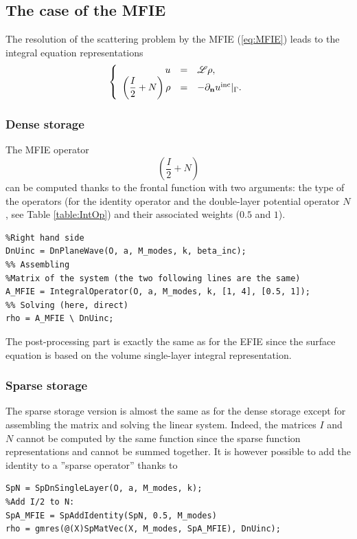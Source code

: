 \subsection{The case of the MFIE}


The resolution of the scattering problem by the MFIE (\ref{eq:MFIE}) leads to the integral equation representations
$$
\left\{\begin{array}{r c l}
u &=& {\mathscr L}\rho,\\
\displaystyle \left(\frac{I}{2}+N\right)\rho &=& -\partial_{\mathbf{n}}u^{\textrm{inc}}|_{\Gamma}.
\end{array}\right.
$$

\subsubsection{Dense storage}

The MFIE operator $$\left(\frac{I}{2}+N\right)$$ can be computed  thanks to the frontal function \IntegralOperator with two
 arguments: the type of the operators (for the identity operator and the double-layer potential operator $N$, see
  Table \ref{table:IntOp}) and their associated weights ($0.5$ and $1$). 
\begin{lstlisting}
%Right hand side
DnUinc = DnPlaneWave(O, a, M_modes, k, beta_inc);
%% Assembling
%Matrix of the system (the two following lines are the same)
A_MFIE = IntegralOperator(O, a, M_modes, k, [1, 4], [0.5, 1]);
%% Solving (here, direct)
rho = A_MFIE \ DnUinc;
\end{lstlisting}
\medskip

The post-processing part is exactly the same as for the EFIE since the surface equation is based on the 
volume single-layer integral representation.

\subsubsection{Sparse storage}

The sparse storage version is almost the same as for the dense storage except for  assembling  the matrix and solving the linear system. Indeed, the matrices
 $I$ and $N$ cannot be computed by the same function since the sparse  function representations \SpIntegralOperator and
  \IntegralOperator cannot be  summed together. It is however possible to add the identity to a ''sparse operator'' thanks to \SpAddIdentity
\begin{lstlisting}
SpN = SpDnSingleLayer(O, a, M_modes, k);
%Add I/2 to N:
SpA_MFIE = SpAddIdentity(SpN, 0.5, M_modes)
rho = gmres(@(X)SpMatVec(X, M_modes, SpA_MFIE), DnUinc);
\end{lstlisting}
\medskip

